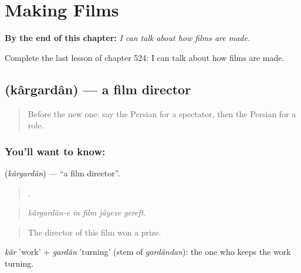 
\chapter{Making Films}
\label{ch:fa-making-films}

\begin{chapteropening}
\textbf{By the end of this chapter:} \emph{I can talk about how films are made.}

Complete the last lesson of chapter 524: I can talk about how films are made.
\end{chapteropening}

\section[\texorpdfstring{\fa{کارگردان} (kârgardân)}{کارگردان (kârgardân)}]{ (kârgardân) — a film director}

\label{lesson:FA-C524-kargardan}



\begin{quote}
Before the new one: say the Persian for a spectator, then the Persian for a role.
\end{quote}

\subsection*{You'll want to know: }
\textbf{} (\emph{kârgardân}) — \textquotedblleft{}a film director\textquotedblright{}.

\begin{quote}
    .
\end{quote}

\begin{quote}
\emph{kârgardân-e in film jâyeze gereft.}
\end{quote}

\begin{quote}
The director of this film won a prize.
\end{quote}

\emph{kâr} 'work' + \emph{gardân} 'turning' (stem of \emph{gardândan}): the one who keeps the work turning.

